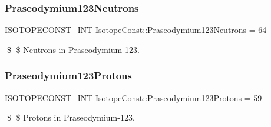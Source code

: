 \subsubsection{\texorpdfstring{Praseodymium123\+Neutrons}{Praseodymium123Neutrons}}
{\footnotesize\ttfamily \mbox{\hyperlink{group___isotope_const-_macros_ga5f18360b3e99483a35c32d789e62621c}{I\+S\+O\+T\+O\+P\+E\+C\+O\+N\+S\+T\+\_\+\+I\+NT}} Isotope\+Const\+::\+Praseodymium123\+Neutrons = 64}

\$ \$ Neutrons in Praseodymium-\/123. \mbox{\label{group___isotope_const-_praseodymium-_pr123_ga1712d1548112570edf760d5ebf392781}} 
\subsubsection{\texorpdfstring{Praseodymium123\+Protons}{Praseodymium123Protons}}
{\footnotesize\ttfamily \mbox{\hyperlink{group___isotope_const-_macros_ga5f18360b3e99483a35c32d789e62621c}{I\+S\+O\+T\+O\+P\+E\+C\+O\+N\+S\+T\+\_\+\+I\+NT}} Isotope\+Const\+::\+Praseodymium123\+Protons = 59}

\$ \$ Protons in Praseodymium-\/123. 